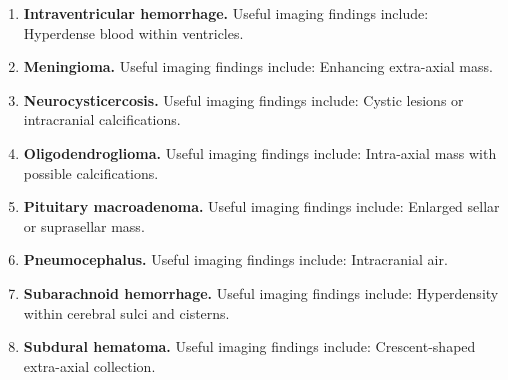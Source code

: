 \begin{enumerate}[leftmargin=*,itemsep=0.45em,topsep=0.4em]
\item \textbf{Intraventricular hemorrhage.} Useful imaging findings include: Hyperdense blood within ventricles.
\item \textbf{Meningioma.} Useful imaging findings include: Enhancing extra-axial mass.
\item \textbf{Neurocysticercosis.} Useful imaging findings include: Cystic lesions or intracranial calcifications.
\item \textbf{Oligodendroglioma.} Useful imaging findings include: Intra-axial mass with possible calcifications.
\item \textbf{Pituitary macroadenoma.} Useful imaging findings include: Enlarged sellar or suprasellar mass.
\item \textbf{Pneumocephalus.} Useful imaging findings include: Intracranial air.
\item \textbf{Subarachnoid hemorrhage.} Useful imaging findings include: Hyperdensity within cerebral sulci and cisterns.
\item \textbf{Subdural hematoma.} Useful imaging findings include: Crescent-shaped extra-axial collection.
\end{enumerate}

